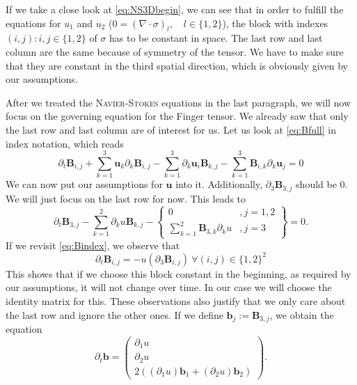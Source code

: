 \documentclass[12pt,a4paper,twoside, open=right]{scrreprt}
\theoremstyle{definition}
\theoremstyle{plain}
\newcommand{\bfu}{\bm{u}}
\newcommand{\bfB}{\bm{B}}
\newcommand{\bfb}{\bm{b}}
\begin{document}
If we take a close look at \eqref{eq:NS3Dbegin}, we can see that in order to fulfill the equations for $u_1$ and $u_2$ ($0=(\nabla\cdot\sigma)_l,\quad l\in\{1,2\}$), the block with indexes $(i,j):i,j\in\{1,2\}$ of $\sigma$ has to be constant in space. The last row and last column are the same because of symmetry of the tensor. We have to make sure that they are constant in the third spatial direction, which is obviously given by our assumptions. 
\par After we treated the \textsc{Navier-Stokes} equations in the last paragraph, we will now focus on the governing equation for the Finger tensor. We already saw that only the last row and last column are of interest for us. Let us look at \eqref{eq:Bfull} in index notation, which reads
\begin{equation}
\label{eq:Bindex}
    \partial_t \bm{B}_{i,j}+\sum_{k=1}^3\bm{u}_k\partial_k \bm{B}_{i,j}-\sum_{k=1}^3\partial_k\bm{u}_i\bm{B}_{k,j}-\sum_{k=1}^3\bm{B}_{i,k}\partial_k\bm{u}_j=0
\end{equation}
We can now put our assumptions for $\bfu$ into it. Additionally, $\partial_3\bfB_{3,j}$ should be $0$. We will just focus on the last row for now. This leads to
\begin{equation}
    \partial_t \bm{B}_{3,j} -\sum_{k=1}^2\partial_ku\bm{B}_{k,j}-\left.\begin{cases}
    0 &, j=1,2\\ \sum_{k=1}^2 \bm{B}_{3,k}\partial_ku &, j=3
    \end{cases}\right\} =0.
\end{equation}
If we revisit \eqref{eq:Bindex}, we observe that
\begin{equation}
     \partial_t \bm{B}_{i,j}=-u(\partial_3 \bm{B}_{i,j})~\forall(i,j)\in\{1,2\}^2
\end{equation}
This shows that if we choose this block constant in the beginning, as required by our assumptions, it will not change over time. In our case we will choose the identity matrix for this. These observations also justify that we only care about the last row and ignore the other ones. If we define $\bfb_j:=\bfB_{3,j}$, we obtain the equation
\begin{equation}
   \partial_t \bm{b}=\begin{pmatrix}
   \partial_1u\\ \partial_2 u \\ 2\left((\partial_1 u)\bm{b}_1+(\partial_2 u)\bm{b}_2\right)
   \end{pmatrix}.
\end{equation}
\end{document}
